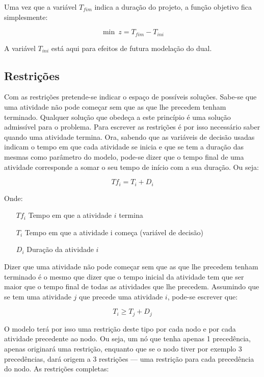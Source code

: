 Uma vez que a variável $T_{fim}$ indica a duração do projeto, a função
objetivo fica simplesmente:

\begin{displaymath} 
	\min~z = T_{fim}-T_{ini} 
\end{displaymath}

A variável $T_{ini}$ está aqui para efeitos de futura modelação do dual.

\subsection{Restrições}

Com as restrições pretende-se indicar o espaço de possíveis soluções. Sabe-se
que uma atividade não pode começar sem que as que lhe precedem tenham terminado.
Qualquer solução que obedeça a este princípio é uma solução admissível para
o problema. Para escrever as restrições é por isso necessário saber quando uma
atividade termina. Ora, sabendo que as variáveis de decisão usadas indicam
o tempo em que cada atividade se inicia e que se tem a duração das mesmas como
parâmetro do modelo, pode-se dizer que o tempo final de uma atividade
corresponde a somar o seu tempo de início com a sua duração. Ou seja:

\begin{displaymath} Tf_{i} = T_{i} + D_{i} \end{displaymath}

Onde:

\begin{itemize} \item[$Tf_{i}$] Tempo em que a atividade $i$ termina
		\item[$T_{i}$] Tempo em que a atividade i começa (variável de decisão)
		\item[$D_{i}$] Duração da atividade $i$ \end{itemize}

Dizer que uma atividade não pode começar sem que as que lhe precedem tenham
terminado é o mesmo que dizer que o tempo inicial da atividade tem que ser maior
que o tempo final de todas as atividades que lhe precedem. Assumindo que se tem
uma atividade $j$ que precede uma atividade $i$, pode-se escrever que:

\begin{displaymath} T_{i} \geq T_{j} + D_{j} \end{displaymath}

O modelo terá por isso uma restrição deste tipo por cada nodo e por cada
atividade precedente ao nodo. Ou seja, um nó que tenha apenas 1 precedência,
apenas originará uma restrição, enquanto que se o nodo tiver por exemplo
3 precedências, dará origem a 3 restrições --- uma restrição para cada precedência
do nodo. 
As restrições completas:

